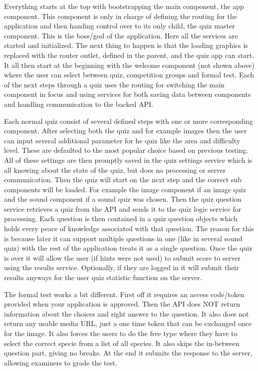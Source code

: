 Everything starts at the top with bootstrapping the main component, the app component. This component is only in charge of defining the routing for the application and then handing control over to its only child, the quiz master component. This is the boss/god of the application. Here all the services are started and initialized. The next thing to happen is that the loading graphics is replaced with the router outlet, defined in the parent, and the quiz app can start. It all then start at the beginning with the welcome component (not shown above) where the user can select between quiz, competition groups and formal test. Each of the next steps through a quiz uses the routing for switching the main component in focus and using services for both saving data between components and handling communication to the backed API.

Each normal quiz consist of several defined steps with one or more corresponding component. After selecting both the quiz and for example images then the user can input several additional parameter for he quiz like the area and difficulty level. These are defaulted to the most popular choice based on previous testing. All of these settings are then promptly saved in the quiz settings service which is all knowing about the state of the quiz, but does no processing or server communication. Then the quiz will start on the next step and the correct sub components will be loaded. For example the image component if an image quiz and the sound component if a sound quiz was chosen. Then the quiz question service retrieves a quiz from the API and sends it to the quiz logic service for processing. Each question is then contained in a quiz question objects which holds every peace of knowledge associated with that question. The reason for this is because later it can support  multiple questions in one (like in several sound quiz) with the rest of the application treats it as a single question. Once the quiz is over it will allow the user (if hints were not used) to submit score to server using the results service. Optionally, if they are logged in it will submit their results anyways for the user quiz statistic function on the server.

The formal test works a bit different. First off it requires an access code/token provided when your application is approved. Then the API does NOT return information about the choices and right answer to the question. It also does not return any usable media URL, just a one time token that can be exchanged once for the image. It also forces the users to do the free type where they have to select the correct specie from a list of all species. It also skips the in-between question part, giving no breaks. At the end it submits the response to the server, allowing examiners to grade the test. 

